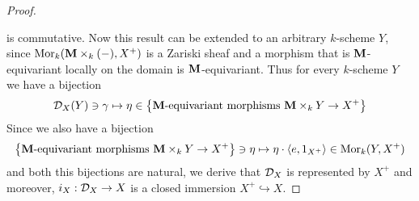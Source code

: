 \begin{proof}
\begin{center}
\end{center}
is commutative. Now this result can be extended to an arbitrary $k$-scheme $Y$, since $\mathrm{Mor}_k(\mathbf{M}\times_k(-),X^+)$ is a Zariski sheaf and a morphism that is $\mathbf{M}$-equivariant locally on the domain is $\mathbf{M}$-equivariant. Thus for every $k$-scheme $Y$ we have a bijection
$${\mathcal D}_X(Y)\ni \gamma \mapsto \eta \in \big\{\mathbf{M}\mbox{-equivariant morphisms }\mathbf{M}\times_kY\rightarrow X^+\big\}$$
Since we also have a bijection
$$\big\{\mathbf{M}\mbox{-equivariant morphisms }\mathbf{M}\times_kY\rightarrow X^+\big\}\ni \eta \mapsto \eta\cdot \langle e, 1_{X^+}\rangle \in \mathrm{Mor}_k(Y,X^+)$$
and both this bijections are natural, we derive that ${\mathcal D}_X$ is represented by $X^+$ and moreover, $i_X:{\mathcal D}_X\rightarrow X$ is a closed immersion $X^+\hookrightarrow X$.
\end{proof}

